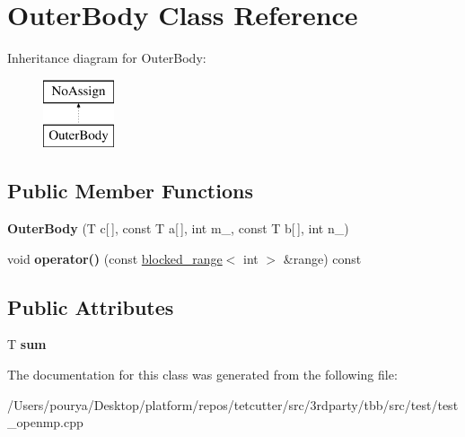 \hypertarget{classOuterBody}{}\section{Outer\+Body Class Reference}
\label{classOuterBody}
Inheritance diagram for Outer\+Body\+:\begin{figure}[H]
\begin{center}
\leavevmode
\includegraphics[height=2.000000cm]{classOuterBody}
\end{center}
\end{figure}
\subsection*{Public Member Functions}
\begin{DoxyCompactItemize}
\item 
\hypertarget{classOuterBody_abf1b4afe799b15cb9762fdf5161e571b}{}{\bfseries Outer\+Body} (T c\mbox{[}$\,$\mbox{]}, const T a\mbox{[}$\,$\mbox{]}, int m\+\_\+, const T b\mbox{[}$\,$\mbox{]}, int n\+\_\+)\label{classOuterBody_abf1b4afe799b15cb9762fdf5161e571b}

\item 
\hypertarget{classOuterBody_ac878480a8869788ba72cad1b0f5a72f1}{}void {\bfseries operator()} (const \hyperlink{classtbb_1_1blocked__range}{blocked\+\_\+range}$<$ int $>$ \&range) const \label{classOuterBody_ac878480a8869788ba72cad1b0f5a72f1}

\end{DoxyCompactItemize}
\subsection*{Public Attributes}
\begin{DoxyCompactItemize}
\item 
\hypertarget{classOuterBody_a44f5a86d61345d7a52529511a38b2de6}{}T {\bfseries sum}\label{classOuterBody_a44f5a86d61345d7a52529511a38b2de6}

\end{DoxyCompactItemize}


The documentation for this class was generated from the following file\+:\begin{DoxyCompactItemize}
\item 
/\+Users/pourya/\+Desktop/platform/repos/tetcutter/src/3rdparty/tbb/src/test/test\+\_\+openmp.\+cpp\end{DoxyCompactItemize}
